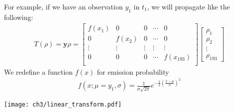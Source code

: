 \begin{definition}
For example, if we have an observation $y_1$ in $t_{1}$, we will propagate like the following:
\begin{align*}
        T(\rho) = \textbf{y} \rho = 
        \begin{bmatrix} 
              f(x_1) & 0 & 0 & \cdots & 0 \\
              0 & f(x_2) & 0 & \cdots & 0 \\
              \vdots & \vdots & \vdots & \vdots & \vdots \\
              0 & 0 & 0 & \cdots & f(x_{193}) \\
        \end{bmatrix}
        \begin{bmatrix} \rho_1 \\ \rho_2 \\ \vdots \\ \rho_{193} \end{bmatrix}    
\end{align*}
We redefine a function $f(x)$ for emission probability
\begin{align*}
f(x; \mu = y_1, \sigma) ={\frac {1}{\sigma {\sqrt {2\pi }}}}e^{-{\frac {1}{2}}\left({\frac {x-\mu }{\sigma }}\right)^{2}}      
\end{align*}
\begin{center}
        \texttt{[image: ch3/linear\_transform.pdf]}   
\end{center}
\end{definition}

